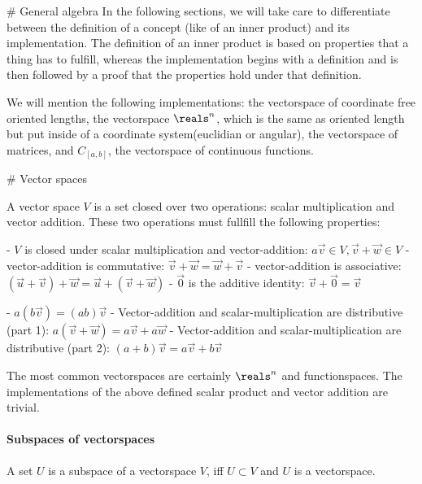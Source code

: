 # General algebra
In the following sections, we will take care to differentiate between the definition of a concept (like of an inner product) and its implementation. The definition of an inner product is based on properties that a thing has to fulfill, whereas the implementation begins with a definition and is then followed by a proof that the properties hold under that definition.

We will mention the following implementations: the vectorspace of coordinate free oriented lengths, the vectorspace $\reals^n$, which is the same as oriented length but put inside of a coordinate system(euclidian or angular), the vectorspace of matrices, and $C_{[a,b]}$, the vectorspace of continuous functions.

# Vector spaces
 

\begin{definition} A vector space $V$ is a set closed over two operations: scalar multiplication and vector addition. These two operations must fullfill the following properties:

    - $V$ is closed under scalar multiplication and vector-addition: $a\vec{v} \in V, \vec{v} + \vec{w} \in V$
    - vector-addition is commutative: $\vec{v} + \vec{w} = \vec{w} + \vec{v}$
    - vector-addition is associative: $(\vec{u} + \vec{v}) + \vec{w} = \vec{u} + (\vec{v} + \vec{w})$
    - $\vec{0}$ is the additive identity: $\vec{v} + \vec{0} = \vec{v}$
    
    - $a(b\vec{v}) = (ab)\vec{v}$
    - Vector-addition and scalar-multiplication are distributive (part 1): $a(\vec{v} + \vec{w}) = a\vec{v} + a\vec{w}$
    - Vector-addition and scalar-multiplication are distributive (part 2): $(a+b)\vec{v} = a\vec{v} + b\vec{v}$

\end{definition}

The most common vectorspaces are certainly $\reals^n$ and functionspaces.
The implementations of the above defined scalar product and vector addition are trivial.







\paragraph{Subspaces of vectorspaces}
A set $U$ is a subspace of a vectorspace $V$, iff $U \subset V$ and $U$ is a vectorspace.








